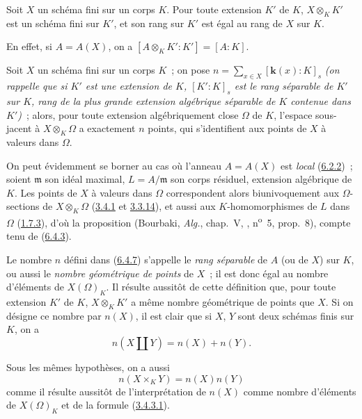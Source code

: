 \begin{corollary}[6.4.6]
\label{I.6.4.6-fr}
Soit $X$ un schéma fini sur un corps $K$. Pour toute extension $K'$ de $K$,
$X\otimes_K K'$ est un schéma fini sur $K'$, et son rang sur $K'$ est égal au
rang de $X$ sur $K$.
\end{corollary}

En effet, si $A=A(X)$, on a $[A\otimes_K K':K']=[A:K]$.

\begin{corollary}[6.4.7]
\label{I.6.4.7-fr}
Soit $X$ un schéma fini sur un corps $K$~; on pose
$n=\sum_{x\in X}[\boldsymbol{k}(x):K]_s$
\emph{(on rappelle que si $K'$ est une extension de $K$, $[K':K]_s$ est le
\emph{rang séparable} de $K'$ sur $K$, rang de la plus grande extension
algébrique séparable de $K$ contenue dans $K'$)}~;
alors, pour toute extension algébriquement close $\Omega$ de $K$, l'espace
sous-jacent à $X\otimes_K\Omega$ a exactement $n$ points, qui s'identifient
aux points de $X$ à valeurs dans $\Omega$.
\end{corollary}

On peut évidemment se borner au cas où l'anneau $A=A(X)$ est \emph{local}
(\hyperref[I.6.2.2-fr]{6.2.2})~; soient $\mathfrak m$ son idéal maximal,
$L=A/\mathfrak m$ son corps résiduel, extension algébrique de $K$. Les points
de $X$ à valeurs dans $\Omega$ correspondent alors biunivoquement aux
$\Omega$-sections de $X\otimes_K\Omega$
(\hyperref[I.3.4.1-fr]{3.4.1} et \hyperref[I.3.3.14-fr]{3.3.14}), et aussi
aux $K$-homomorphismes de $L$ dans $\Omega$
(\hyperref[I.1.7.3-fr]{1.7.3}), d'où la proposition (Bourbaki, \emph{Alg.},
chap.~V, , n\textsuperscript{o}~5, prop.~8), compte tenu de
(\hyperref[I.6.4.3-fr]{6.4.3}).

\begin{env}[6.4.8]
\label{I.6.4.8-fr}
Le nombre $n$ défini dans (\hyperref[I.6.4.7-fr]{6.4.7}) s'appelle le
\emph{rang séparable} de $A$ (ou de $X$) sur $K$, ou aussi le
\emph{nombre géométrique de points} de $X$~; il est donc égal au nombre
d'éléments de $X(\Omega)_K$. Il résulte aussitôt de cette définition que,
pour toute extension $K'$ de $K$, $X\otimes_K K'$ a même nombre géométrique
de points que $X$. Si on désigne ce nombre par $n(X)$, il est clair que si
$X$, $Y$ sont deux schémas finis sur $K$, on a
\[
  n(X\amalg Y)=n(X)+n(Y).
  \tag{6.4.8.1}\label{I.6.4.8.1-fr}
\]

Sous les mêmes hypothèses, on a aussi
\[
  n(X\times_K Y)=n(X)n(Y)
  \tag{6.4.8.2}\label{I.6.4.8.2-fr}
\]
comme il résulte aussitôt de l'interprétation de $n(X)$ comme nombre
d'éléments de $X(\Omega)_K$ et de la formule
(\hyperref[I.3.4.3.1-fr]{3.4.3.1}).
\end{env}


